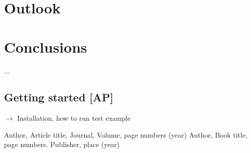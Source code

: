 \section{Outlook}
\label{conc}


\section{Conclusions}
\label{conc}


\begin{acknowledgements}
...
\end{acknowledgements}


\begin{appendix}




\section{Getting started {\bf [AP]}}
\label{code_init}

$\to$ Installation, how to run test example







\end{appendix}



\begin{thebibliography}{}
%
%
Author, Article title, Journal, Volume, page numbers (year)
Author, Book title, page numbers. Publisher, place (year)
\end{thebibliography}



